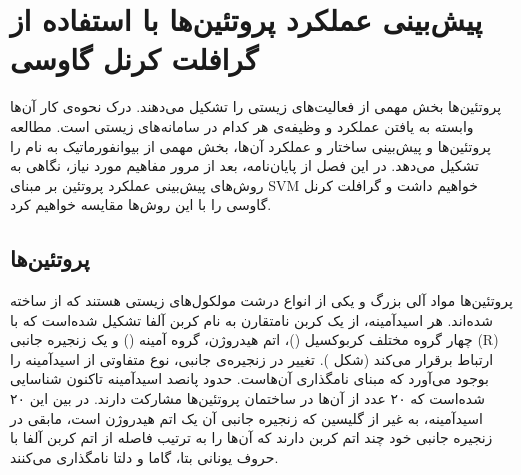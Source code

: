 \chapter{پیش‌بینی عملکرد پروتئین‌ها با استفاده از گرافلت کرنل گاوسی}\label{chap:protein_function_prediction}

پروتئین‌ها بخش مهمی از فعالیت‌های زیستی را تشکیل می‌دهند. درک نحوه‌ی کار آن‌ها وابسته به یافتن عملکرد و وظیفه‌ی هر کدام در سامانه‌های زیستی است. مطالعه پروتئین‌ها و پیش‌بینی ساختار و عملکرد آن‌ها، بخش مهمی از بیوانفورماتیک به نام  را تشکیل می‌دهد. در این فصل از پایان‌نامه، بعد از مرور مفاهیم مورد نیاز، نگاهی به روش‌های پیش‌بینی عملکرد پروتئین بر مبنای SVM خواهیم داشت و گرافلت کرنل گاوسی را با این روش‌ها مقایسه خواهیم کرد.

\section{پروتئین‌ها}\label{sec:protein-structure}
پروتئین‌ها مواد آلی بزرگ و یکی از انواع درشت مولکول‌های زیستی هستند که از  ساخته شده‌اند. هر اسیدآمینه، از یک کربن نامتقارن به نام کربن آلفا تشکیل شده‌است که با چهار گروه مختلف کربوکسیل ()، اتم هیدروژن، گروه آمینه () و یک زنجیره جانبی (R) ارتباط برقرار می‌کند (شکل ). تغییر در زنجیره‌ی جانبی، نوع متفاوتی از اسیدآمینه را بوجود می‌آورد که مبنای نامگذاری آن‌هاست. حدود پانصد اسیدآمینه تاکنون شناسایی شده‌است که ۲۰ عدد از آن‌ها در ساختمان پروتئین‌ها مشارکت دارند. در بین این ۲۰ اسیدآمینه، به غیر از گلیسین که زنجیره جانبی آن یک اتم هیدروژن است، مابقی در زنجیره جانبی خود چند اتم کربن دارند که آن‌ها را به ترتیب فاصله از اتم کربن آلفا با حروف یونانی بتا، گاما و دلتا نامگذاری می‌کنند.

